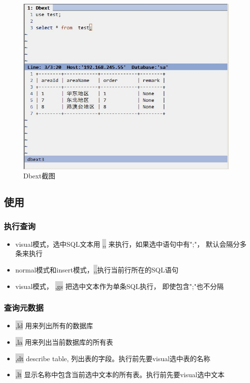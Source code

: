 \documentclass[oneside,openany]{book}
\begin{document}
  \begin{figure}[htbp]%
  \centering
  \includegraphics[scale=0.5]{dbext.jpg}
  \caption{Dbext截图}
  \end{figure}

\subsection{使用}

\subsubsection{执行查询}

    \begin{itemize} 
      \item  visual模式，选中SQL文本用 \colorbox{lightgray}{,,} 来执行，如果选中语句中有";"， 默认会隔分多条来执行
      \item  normal模式和insert模式，\colorbox{lightgray}{,,}执行当前行所在的SQL语句
      \item  visual模式， \colorbox{lightgray}{,gs} 把选中文本作为单条SQL执行， 即使包含";"也不分隔
    \end{itemize} 

\subsubsection{查询元数据}

    \begin{itemize} 
    \item \colorbox{lightgray}{,ld} 用来列出所有的数据库
    \item \colorbox{lightgray}{,la} 用来列出当前数据库的所有表
    \item \colorbox{lightgray}{,dt} describe table, 列出表的字段。执行前先要visual选中表的名称
    \item \colorbox{lightgray}{,lt} 显示名称中包含当前选中文本的所有表。执行前先要visual选中文本
    \end{itemize} 
\end{document}
